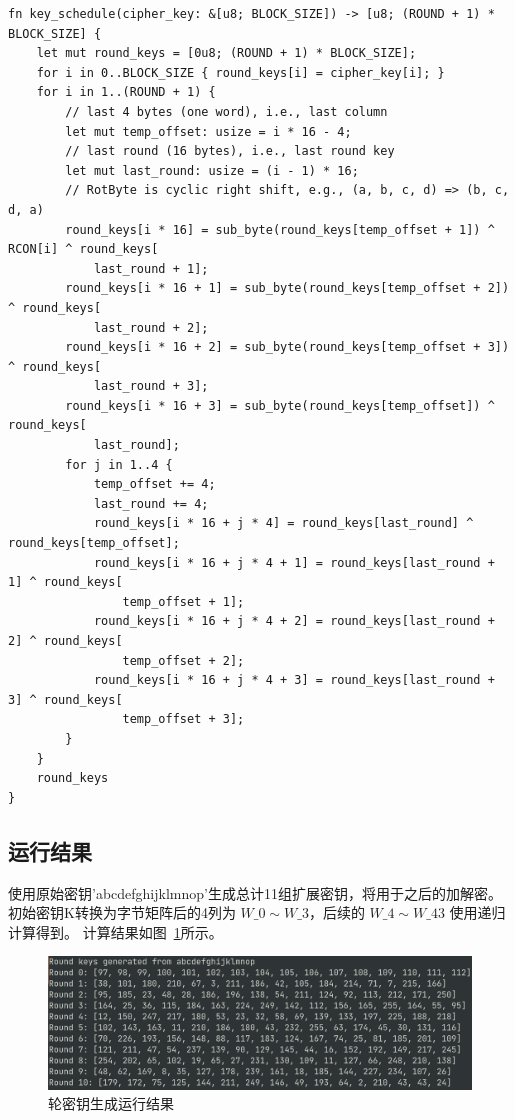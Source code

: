 \documentclass[degree=project,degree-type=project,cjk-font=noto]{thuthesis}
\begin{document}
  \begin{verbatim}
fn key_schedule(cipher_key: &[u8; BLOCK_SIZE]) -> [u8; (ROUND + 1) * BLOCK_SIZE] {
    let mut round_keys = [0u8; (ROUND + 1) * BLOCK_SIZE];
    for i in 0..BLOCK_SIZE { round_keys[i] = cipher_key[i]; }
    for i in 1..(ROUND + 1) {
        // last 4 bytes (one word), i.e., last column
        let mut temp_offset: usize = i * 16 - 4;
        // last round (16 bytes), i.e., last round key
        let mut last_round: usize = (i - 1) * 16;
        // RotByte is cyclic right shift, e.g., (a, b, c, d) => (b, c, d, a)
        round_keys[i * 16] = sub_byte(round_keys[temp_offset + 1]) ^ RCON[i] ^ round_keys[
            last_round + 1];
        round_keys[i * 16 + 1] = sub_byte(round_keys[temp_offset + 2]) ^ round_keys[
            last_round + 2];
        round_keys[i * 16 + 2] = sub_byte(round_keys[temp_offset + 3]) ^ round_keys[
            last_round + 3];
        round_keys[i * 16 + 3] = sub_byte(round_keys[temp_offset]) ^ round_keys[
            last_round];
        for j in 1..4 {
            temp_offset += 4;
            last_round += 4;
            round_keys[i * 16 + j * 4] = round_keys[last_round] ^ round_keys[temp_offset];
            round_keys[i * 16 + j * 4 + 1] = round_keys[last_round + 1] ^ round_keys[
                temp_offset + 1];
            round_keys[i * 16 + j * 4 + 2] = round_keys[last_round + 2] ^ round_keys[
                temp_offset + 2];
            round_keys[i * 16 + j * 4 + 3] = round_keys[last_round + 3] ^ round_keys[
                temp_offset + 3];
        }
    }
    round_keys
}
\end{verbatim}

\subsection{运行结果}

使用原始密钥'abcdefghijklmnop'生成总计11组扩展密钥，将用于之后的加解密。初始密钥K转换为字节矩阵后的4列为 $W\_0 \sim W\_3$，后续的 $W\_4 \sim W\_{43}$ 使用递归计算得到。
计算结果如图~\ref{fig:t3}所示。

    \begin{figure}[h]
\centering%
\includegraphics[width=\linewidth]{aes_t3.png}
  \caption{轮密钥生成运行结果}
  \label{fig:t3}
\end{figure}
\end{document}
